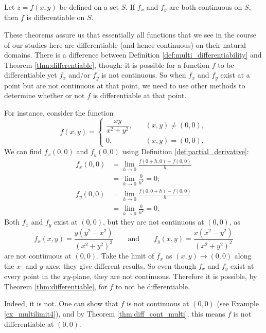 \begin{theorem}\label{thm:differentiable}
Let $z=f(x,y)$ be defined on a set $S$. 
If $f_x$ and $f_y$ are both continuous on $S$, then $f$ is differentiable on $S$.
\end{theorem}

%
%
These theorems assure us that  essentially all functions that we see in the course of our studies here are differentiable (and hence continuous) on their natural domains. There is a difference between Definition \ref{def:multi_differentiability} and Theorem \ref{thm:differentiable}, though: it is possible for a function $f$ to be differentiable yet $f_x$ and/or $f_y$ is not continuous. 
So when $f_x$ and $f_y$  exist at a point but are not continuous at that point, we need to use other methods to determine whether or not $f$ is differentiable at that point.

For instance, consider the function 
$$f(x,y) = \left\{\begin{array}{ll} \dfrac{xy}{x^2+y^2}, & \quad  (x,y)\neq (0,0), \\
0, & \quad (x,y) = (0,0),\end{array}\right.$$
We can find $f_x(0,0)$ and $f_y(0,0)$ using Definition 	\ref{def:partial_derivative}:
\begin{align*}
f_x(0,0) &= \lim_{h\to 0} \frac{f(0+h,0) - f(0,0)}{h} \\[0.2cm]
				&= \lim_{h\to 0} \frac{0}{h^2} = 0;\\[0.2cm]
f_y(0,0) &= \lim_{h\to 0} \frac{f(0,0+h) - f(0,0)}{h} \\[0.2cm]
				&= \lim_{h\to 0} \frac{0}{h^2} = 0.
\end{align*}
Both $f_x$ and $f_y$ exist at $(0,0)$, but they are not continuous at $(0,0)$, as 
$$f_x(x,y) = \frac{y(y^2-x^2)}{(x^2+y^2)^2} \qquad \text{and}\qquad f_y(x,y) = \frac{x(x^2-y^2)}{(x^2+y^2)^2} $$ are not continuous at $(0,0)$. Take the limit of $f_x$ as $(x,y)\to(0,0)$ along the $x$- and $y$-axes; they give different results. So even though $f_x$ and $f_y$ exist at every point in the $xy$-plane, they are not continuous. Therefore it is possible, by Theorem \ref{thm:differentiable}, for $f$ to not be differentiable.

 Indeed, it is not. One can show that $f$ is not continuous at $(0,0)$ (see Example \ref{ex_multilimit4}), and by Theorem \ref{thm:diff_cont_multi}, this means $f$ is not differentiable at $(0,0)$.\\
														
